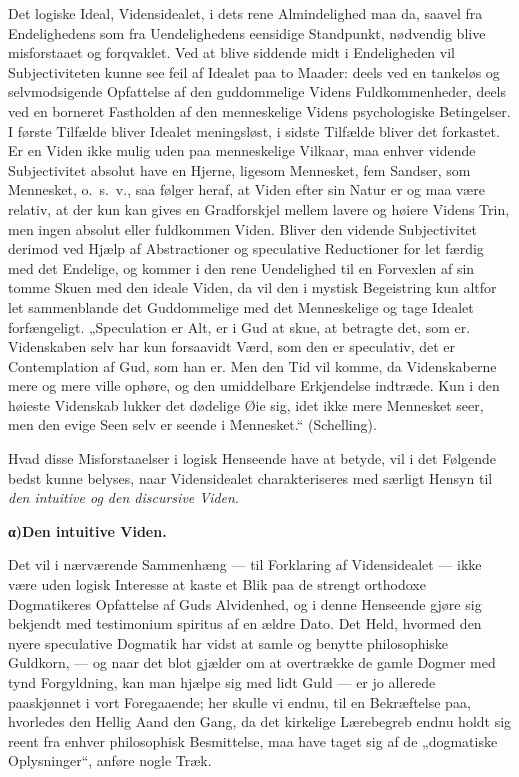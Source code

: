 \documentclass[12pt]{book}
\newcommand{\opage}[1]{\marginnote{\footnotesize\textit{[#1]}}}
\begin{document}
Det logiske Ideal, Vidensidealet, i dets rene Almindelighed maa da, saavel fra Endelighedens som
fra Uendelighedens eensidige Standpunkt, nødvendig blive misforstaaet og forqvaklet. Ved at blive
siddende midt i Endeligheden vil Subjectiviteten kunne see feil af Idealet paa to Maader: deels
ved en tankeløs og selvmodsigende Opfattelse af den guddommelige Videns Fuldkommenheder, deels ved
en borneret Fastholden af den menneskelige Videns psychologiske Betingelser. I første Tilfælde
bliver Idealet meningsløst, i sidste Tilfælde bliver det forkastet. Er en Viden ikke mulig uden paa
menneskelige Vilkaar, maa enhver vidende Subjectivitet absolut have en Hjerne, ligesom Mennesket,
fem Sandser, som Mennesket, o.\ s.\ v., saa følger heraf, at Viden efter sin Natur er og maa være
relativ, at der kun kan gives en Gradforskjel mellem lavere og høiere Videns Trin, men ingen
absolut eller fuldkommen Viden. Bliver den vidende Subjectivitet derimod ved Hjælp af Abstractioner
og speculative Reductioner for let færdig med det Endelige, og kommer i den rene Uendelighed til en
Forvexlen af sin tomme Skuen med den ideale Viden, da vil den i mystisk Begeistring kun altfor let
sammenblande det Guddommelige med det Menneskelige og tage Idealet forfængeligt. „Speculation er
Alt, er i Gud at skue, at betragte det, som er. Videnskaben selv har kun forsaavidt Værd, som den
er speculativ, det er Contemplation af Gud, som han er. Men den Tid vil komme,
\opage{234} da Videnskaberne mere og mere ville ophøre, og den umiddelbare Erkjendelse indtræde. Kun i den
høieste Videnskab lukker det dødelige Øie sig, idet ikke mere Mennesket seer, men den evige Seen
selv er seende i Mennesket.“ (Schelling).

Hvad disse Misforstaaelser i logisk Henseende have at betyde, vil i det Følgende bedst kunne
belyses, naar Vidensidealet charakteriseres med særligt Hensyn til \emph{den intuitive og den
discursive Viden}.

\begin{center}{\bfseries α)\quad Den intuitive Viden.}\end{center}

Det vil i nærværende Sammenhæng --- til Forklaring af Vidensidealet --- ikke være uden logisk
Interesse at kaste et Blik paa de strengt orthodoxe Dogmatikeres Opfattelse af Guds Alvidenhed, og
i denne Henseende gjøre sig bekjendt med testimonium spiritus af en ældre Dato. Det Held, hvormed
den nyere speculative Dogmatik har vidst at samle og benytte philosophiske Guldkorn, --- og naar
det blot gjælder om at overtrække de gamle Dogmer med tynd Forgyldning, kan man hjælpe sig med lidt
Guld --- er jo allerede paaskjønnet i vort Foregaaende; her skulle vi endnu, til en Bekræftelse
paa, hvorledes den Hellig Aand den Gang, da det kirkelige Lærebegreb endnu holdt sig reent fra
enhver philosophisk Besmittelse, maa have taget sig af de „dogmatiske Oplysninger“, anføre nogle
Træk.
\end{document}
